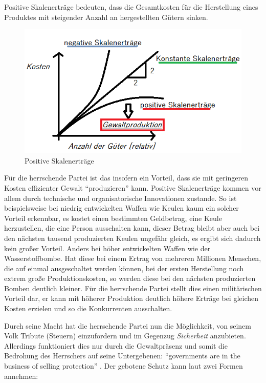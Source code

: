 Positive Skalenerträge bedeuten, dass die Gesamtkosten für die Herstellung eines Produktes mit steigender  Anzahl an hergestellten Gütern sinken.

\begin{figure}[htbp]
	\begin{center}
	\includegraphics[width=1\textwidth]{img/Skalenertraege.png}
	\caption{Positive Skalenerträge}
	\label{fig:skalenertraege}
	\end{center}
\end{figure}

Für die herrschende Partei ist das insofern ein Vorteil, dass sie mit geringeren Kosten effizienter Gewalt ``produzieren'' kann.
Positive Skalenerträge kommen vor allem durch technische und organisatorische Innovationen zustande.
So ist beispielsweise bei niedrig entwickelten Waffen wie Keulen kaum ein solcher Vorteil erkennbar, es kostet einen bestimmten Geldbetrag, eine Keule herzustellen, die  eine Person ausschalten kann, dieser Betrag bleibt aber auch bei den nächsten tausend produzierten Keulen ungefähr gleich, es ergibt sich dadurch kein großer Vorteil.
Anders bei höher entwickelten Waffen wie der Wasserstoffbombe.
Hat diese bei einem Ertrag von mehreren Millionen Menschen, die auf einmal ausgeschaltet werden können, bei der ersten Herstellung noch extrem große Produktionskosten, so werden diese bei den nächsten produzierten Bomben deutlich kleiner.
Für die herrschende Partei stellt dies einen militärischen Vorteil dar, er kann mit höherer Produktion deutlich höhere Erträge bei gleichen Kosten erzielen und so die Konkurrenten ausschalten.

Durch seine Macht hat die herrschende Partei nun die Möglichkeit, von seinem Volk  Tribute (Steuern) einzufordern und im Gegenzug \emph{Sicherheit} anzubieten.
Allerdings funktioniert dies nur durch die Gewaltpräsenz und somit die Bedrohung des Herrschers auf seine Untergebenen: ``governments are in the business of selling protection'' \parencite[175]{Tilly-1985-aa}.
Der gebotene Schutz kann laut \citeauthor{Tilly-1985-aa} zwei Formen annehmen:

